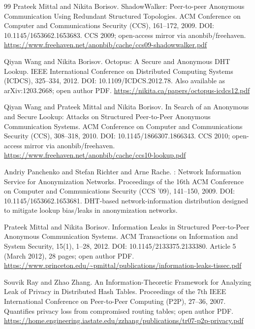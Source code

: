 \documentclass[11pt]{article}
\begin{document}
\begin{thebibliography}{99}
Prateek Mittal and Nikita Borisov.
\newblock ShadowWalker: Peer-to-peer Anonymous Communication Using Redundant Structured Topologies.
\newblock ACM Conference on Computer and Communications Security (CCS), 161--172, 2009.
\newblock DOI: 10.1145/1653662.1653683.
\newblock CCS 2009; open-access mirror via anonbib/freehaven.
\newblock \url{https://www.freehaven.net/anonbib/cache/ccs09-shadowwalker.pdf}

Qiyan Wang and Nikita Borisov.
\newblock Octopus: A Secure and Anonymous {DHT} Lookup.
\newblock IEEE International Conference on Distributed Computing Systems (ICDCS), 325--334, 2012.
\newblock DOI: 10.1109/ICDCS.2012.78.
\newblock Also available as arXiv:1203.2668; open author PDF.
\newblock \url{https://nikita.ca/papers/octopus-icdcs12.pdf}

Qiyan Wang and Prateek Mittal and Nikita Borisov.
\newblock In Search of an Anonymous and Secure Lookup: Attacks on Structured Peer-to-Peer Anonymous Communication Systems.
\newblock ACM Conference on Computer and Communications Security (CCS), 308--318, 2010.
\newblock DOI: 10.1145/1866307.1866343.
\newblock CCS 2010; open-access mirror via anonbib/freehaven.
\newblock \url{https://www.freehaven.net/anonbib/cache/ccs10-lookup.pdf}

Andriy Panchenko and Stefan Richter and Arne Rache.
: Network Information Service for Anonymization Networks.
\newblock Proceedings of the 16th {ACM} Conference on Computer and Communications Security (CCS '09), 141--150, 2009.
\newblock DOI: 10.1145/1653662.1653681.
\newblock DHT-based network-information distribution designed to mitigate lookup bias/leaks in anonymization networks.

Prateek Mittal and Nikita Borisov.
\newblock Information Leaks in Structured Peer-to-Peer Anonymous Communication Systems.
\newblock ACM Transactions on Information and System Security, 15(1), 1--28, 2012.
\newblock DOI: 10.1145/2133375.2133380.
\newblock Article 5 (March 2012), 28 pages; open author PDF.
\newblock \url{https://www.princeton.edu/~pmittal/publications/information-leaks-tissec.pdf}

Souvik Ray and Zhao Zhang.
\newblock An Information-Theoretic Framework for Analyzing Leak of Privacy in Distributed Hash Tables.
\newblock Proceedings of the 7th {IEEE} International Conference on Peer-to-Peer Computing (P2P), 27--36, 2007.
\newblock Quantifies privacy loss from compromised routing tables; open author PDF.
\newblock \url{https://home.engineering.iastate.edu/zzhang/publications/tr07-p2p-privacy.pdf}


\end{thebibliography}
\end{document}

